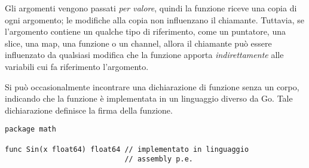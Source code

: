 Gli argomenti vengono passati \textit{per valore}, quindi la funzione riceve una copia di ogni argomento;
le modifiche alla copia non influenzano il chiamante.
Tuttavia, se l'argomento contiene un qualche tipo di riferimento, come un puntatore, una slice, una map, una funzione o un channel, allora il chiamante può essere influenzato da qualsiasi modifica che la funzione apporta \textit{indirettamente} alle variabili cui fa riferimento l'argomento.

Si può occasionalmente incontrare una dichiarazione di funzione senza un corpo, indicando che la funzione è implementata in un linguaggio diverso da Go.
Tale dichiarazione definisce la firma della funzione.
\begin{lstlisting}[frame=single, label={lst:lstlisting4-1.4}]
package math

func Sin(x float64) float64 // implementato in linguaggio
                            // assembly p.e.
\end{lstlisting}


